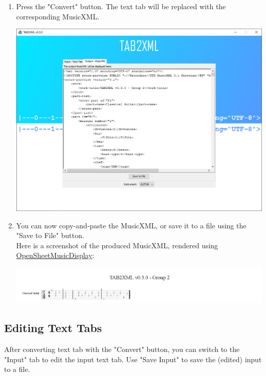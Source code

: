 \documentclass[11pt]{article}
\begin{document}
\begin{enumerate}
\begin{center}
\end{center}
\item Press the "Convert" button.  The text tab will be replaced with the corresponding MusicXML.
\begin{center}
\includegraphics[width=.9\linewidth]{../Screenshots/converted-20210317-tabbedview.png}
\end{center}
\item You can now copy-and-paste the MusicXML, or save it to a file using the "Save to File" button. \\
Here is a screenshot of the produced MusicXML, rendered using \href{https://opensheetmusicdisplay.github.io/demo/}{OpenSheetMusicDisplay}:
\begin{center}
\includegraphics[width=.9\linewidth]{../Screenshots/converted-20210317-opensheetmusicdisplay.png}
\end{center}
\end{enumerate}
\subsection{Editing Text Tabs}
\label{sec:org020598a}
After converting text tab with the "Convert" button, you can switch to the "Input" tab to edit the input text tab.  Use "Save Input" to save the (edited) input to a file.
\end{document}
